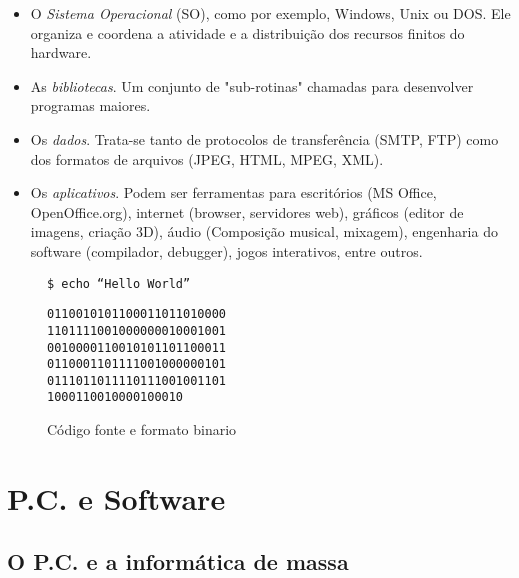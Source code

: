 \begin{itemize}
\item O \emph{Sistema Operacional} (SO), como por exemplo, Windows, Unix ou DOS. Ele organiza e coordena a atividade e a distribuição dos recursos finitos do hardware.
\item As \emph{bibliotecas}. Um conjunto de "sub-rotinas" chamadas para desenvolver programas maiores.

\item Os \emph {dados}. Trata-se tanto de protocolos de transferência (SMTP, FTP) como dos formatos de arquivos (JPEG, HTML, MPEG, XML).

\item Os \emph{aplicativos}. Podem ser ferramentas para escritórios (MS Office, OpenOffice.org), internet (browser, servidores web), gráficos (editor de imagens, criação 3D), áudio (Composição musical, mixagem), engenharia do software (compilador, debugger), jogos interativos, entre outros.
\end{itemize}


\begin{center}
\begin{figure}[htb]

\caption{C\'odigo fonte e formato binario}
\label{fig1.1}

\begin{multicols}{2}

\begin{verbatim}
$ echo “Hello World”
\end{verbatim}

\columnbreak

\begin{verbatim}
0110010101100011011010000
1101111001000000010001001
0010000110010101101100011
0110001101111001000000101
0111011011110111001001101
1000110010000100010
\end{verbatim}

\end{multicols}
\end{figure}
\end{center}


\section{P.C. e Software} \label{1.2}

\subsection{O P.C. e a informática de massa} \label{1.2.1}
	
